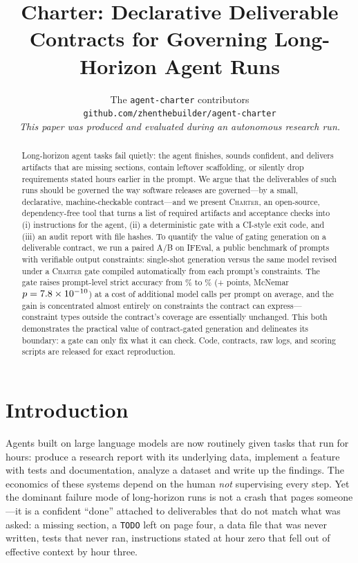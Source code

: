 \documentclass{article}
\title{Charter: Declarative Deliverable Contracts for Governing Long-Horizon Agent Runs}
\author{%
  The \texttt{agent-charter} contributors\\
  \texttt{github.com/zhenthebuilder/agent-charter}\\
  \textit{This paper was produced and evaluated during an autonomous research run.}
}
\begin{document}
\maketitle

\begin{abstract}
  Long-horizon agent tasks fail quietly: the agent finishes, sounds confident,
  and delivers artifacts that are missing sections, contain leftover scaffolding,
  or silently drop requirements stated hours earlier in the prompt. We argue that
  the deliverables of such runs should be governed the way software releases are
  governed---by a small, declarative, machine-checkable contract---and we present
  \textsc{Charter}, an open-source, dependency-free tool that turns a list of
  required artifacts and acceptance checks into (i) instructions for the agent,
  (ii) a deterministic gate with a CI-style exit code, and (iii) an audit report
  with file hashes. To quantify the value of gating generation on a deliverable
  contract, we run a paired A/B on IFEval, a public benchmark of \NPrompts{}
  prompts with verifiable output constraints: single-shot generation versus the
  same model revised under a \textsc{Charter} gate compiled automatically from
  each prompt's constraints. The gate raises prompt-level strict accuracy from
  \ControlPromptStrict\% to \TreatmentPromptStrict\%
  (+\DeltaPromptStrict{} points, McNemar $p = 7.8 \times 10^{-10}$) at a cost of
  \MeanRevisions{} additional model calls per prompt on average, and the gain is
  concentrated almost entirely on constraints the contract can express---%
  constraint types outside the contract's coverage are essentially unchanged.
  This both demonstrates the practical value of contract-gated generation and
  delineates its boundary: a gate can only fix what it can check. Code, contracts,
  raw logs, and scoring scripts are released for exact reproduction.
\end{abstract}

\section{Introduction}

Agents built on large language models are now routinely given tasks that run for
hours: produce a research report with its underlying data, implement a feature
with tests and documentation, analyze a dataset and write up the findings. The
economics of these systems depend on the human \emph{not} supervising every step.
Yet the dominant failure mode of long-horizon runs is not a crash that pages
someone---it is a confident ``done'' attached to deliverables that do not match
what was asked: a missing section, a \texttt{TODO} left on page four, a data file
that was never written, tests that never ran, instructions stated at hour zero
that fell out of effective context by hour three.
\end{document}
